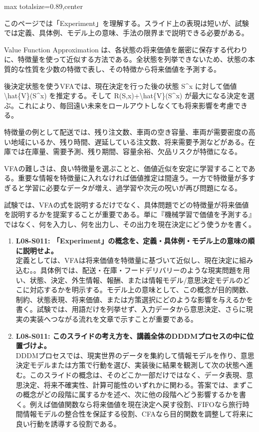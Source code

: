 \begin{minipage}[t]{0.58\textwidth}
\begin{adjustbox}{max totalsize={\textwidth}{0.89\textheight},center}
\begin{minipage}{\textwidth}\scriptsize
{}このページでは「Experiment」を理解する。スライド上の表現は短いが、試験では定義、具体例、モデル上の意味、手法の限界まで説明できる必要がある。\par
Value Function Approximation は、各状態の将来価値を厳密に保存する代わりに、特徴量を使って近似する方法である。全状態を列挙できないため、状態の本質的な性質を少数の特徴で表し、その特徴から将来価値を予測する。\par
後決定状態を使うVFAでは、現在決定を行った後の状態 S\textasciicircum{}x に対して価値 \textbackslash{}hat\{V\}(S\textasciicircum{}x) を推定する。そして R(S,x)+\textbackslash{}hat\{V\}(S\textasciicircum{}x) が最大になる決定を選ぶ。これにより、毎回遠い未来をロールアウトしなくても将来影響を考慮できる。\par
特徴量の例として配送では、残り注文数、車両の空き容量、車両が需要密度の高い地域にいるか、残り時間、遅延している注文数、将来需要予測などがある。在庫では在庫量、需要予測、残り期間、容量余裕、欠品リスクが特徴になる。\par
VFAの難しさは、良い特徴量を選ぶことと、価値近似を安定に学習することである。重要な情報を特徴量に入れなければ価値推定は間違う。一方で特徴量が多すぎると学習に必要なデータが増え、過学習や次元の呪いが再び問題になる。\par
試験では、VFAの式を説明するだけでなく、具体問題でどの特徴量が将来価値を説明するかを提案することが重要である。単に『機械学習で価値を予測する』ではなく、何を入力し、何を出力し、その出力を現在決定にどう使うかを書く。\par{}\begin{enumerate}\item \textbf{L08-S011: 「Experiment」の概念を、定義・具体例・モデル上の意味の順に説明せよ。}\\定義としては、VFAは将来価値を特徴量に基づいて近似し、現在決定に組み込む。。具体例では、配送・在庫・フードデリバリーのような現実問題を用い、状態、決定、外生情報、報酬、または情報モデル/意思決定モデルのどこに対応するかを明示する。モデル上の意味として、この概念が目的関数、制約、状態表現、将来価値、または方策選択にどのような影響を与えるかを書く。試験では、用語だけを列挙せず、入力データから意思決定、さらに現実の実装へつながる流れを文章で示すことが重要である。\item \textbf{L08-S011: このスライドの考え方を、講義全体のDDDMプロセスの中に位置づけよ。}\\DDDMプロセスでは、現実世界のデータを集約して情報モデルを作り、意思決定モデルまたは方策で行動を選び、実装後に結果を観測して次の状態へ進む。このスライドの概念は、そのどこか一部だけではなく、データ表現、意思決定、将来不確実性、計算可能性のいずれかに関わる。答案では、まずこの概念がどの段階に属するかを述べ、次に他の段階へどう影響するかを書く。例えば価値関数なら将来価値を現在決定へ戻す役割、FIFOなら旅行時間情報モデルの整合性を保証する役割、CFAなら目的関数を調整して将来に良い行動を誘導する役割である。\end{enumerate}

\end{minipage}
\end{adjustbox}
\end{minipage}
